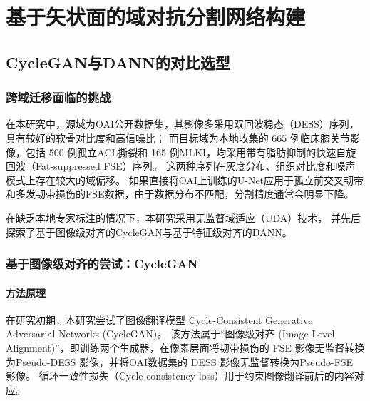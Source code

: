 
\chapter{基于矢状面的域对抗分割网络构建}

\section{CycleGAN与DANN的对比选型}
  \subsection{跨域迁移面临的挑战}
    在本研究中，源域为OAI公开数据集，其影像多采用双回波稳态（DESS）序列，具有较好的软骨对比度和高信噪比；
    而目标域为本地收集的 \num{665} 例临床膝关节影像，包括 \num{500} 例孤立ACL撕裂和 \num{165} 例MLKI，均采用带有脂肪抑制的快速自旋回波（Fat-suppressed FSE）序列。
    这两种序列在灰度分布、组织对比度和噪声模式上存在较大的域偏移。
    如果直接将OAI上训练的U-Net应用于孤立前交叉韧带和多发韧带损伤的FSE数据，由于数据分布不匹配，分割精度通常会明显下降。
    \par 在缺乏本地专家标注的情况下，本研究采用无监督域适应（UDA）技术，
    并先后探索了基于图像级对齐的CycleGAN\cite{zhuUnpairedImagetoImageTranslation2017}与基于特征级对齐的DANN\cite{ganinDomainAdversarialTrainingNeural2017}。
  \subsection{基于图像级对齐的尝试：CycleGAN}
    \subsubsection{方法原理}
      在研究初期，本研究尝试了图像翻译模型 Cycle-Consistent Generative Adversarial Networks (CycleGAN)。
      该方法属于“图像级对齐 (Image-Level Alignment)”，即训练两个生成器，在像素层面将韧带损伤的 FSE 影像无监督转换为Pseudo-DESS 影像，并将OAI数据集的 DESS 影像无监督转换为Pseudo-FSE 影像。
      循环一致性损失（Cycle-consistency loss）用于约束图像翻译前后的内容对应。

